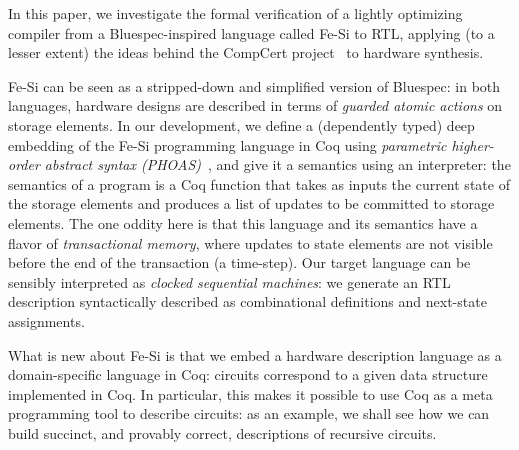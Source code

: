 \documentclass{llncs}
\newcommand{\project}{Fe-Si}
\begin{document}
\medskip In this paper, we investigate the formal verification of a
lightly optimizing compiler from a Bluespec-inspired language called
\project{} to RTL, applying (to a lesser extent) the ideas behind the
CompCert project~\cite{Leroy-backend} to hardware synthesis.

\medskip

\project{} can be seen as a stripped-down and simplified version
of Bluespec: in both languages, hardware designs are described in
terms of \emph{guarded atomic actions} on storage elements. 
%
In our development, we define a (dependently typed) deep embedding of
the \project{} programming language in Coq using \emph{parametric
  higher-order abstract syntax (PHOAS)}~\cite{phoas-chlipala}, and
give it a semantics\thomas{~} using an interpreter: the semantics of a program
is a Coq function that takes as inputs the current state of the
storage elements and produces a list of updates to be committed to
storage elements.
%
The one oddity here is that this language and its semantics have a
flavor of \emph{transactional memory}, where updates to state
elements are not visible before the end of the transaction (a
time-step).
%
Our target language can be sensibly interpreted as \emph{clocked
  sequential machines}: we generate an RTL description syntactically
described as combinational definitions and next-state assignments.

\medskip

What is new about \project{} is that we embed a hardware description
language as a domain-specific language in Coq: circuits correspond to
a given data structure implemented in Coq.
%
In particular, this makes it possible to use Coq as a meta programming
tool to describe circuits: as an example, we shall see how we can
build succinct, and provably correct, descriptions of recursive
circuits.



\end{document}
